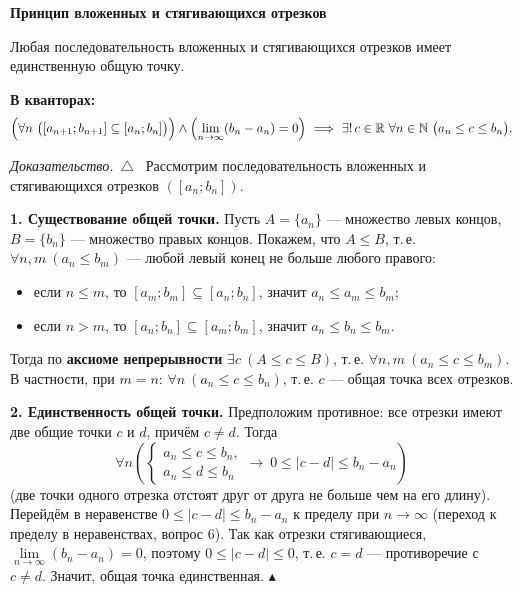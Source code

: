 \documentclass[a4paper,11pt]{article}
\newcommand{\N}{\mathbb{N}}
\newcommand{\R}{\mathbb{R}}
\newcommand{\kv}{\par\noindent\textbf{\textcolor{oprc!85!black}{В кванторах:}}}
\newenvironment{dok}
  {\par\smallskip\noindent\textit{Доказательство.}\ $\triangle$\ \ignorespaces}
  {\unskip\nobreak\hfill$\blacktriangle$\par\smallskip}
\newcommand{\podr}[1]{\par\needspace{8\baselineskip}\medskip
  {\large\bfseries\textcolor{oprc!80!black}{#1}}\par\nopagebreak\smallskip}
\begin{document}
\begin{center}
\end{center}

\podr{Принцип вложенных и стягивающихся отрезков}

\begin{teo}
Любая последовательность вложенных и стягивающихся отрезков имеет единственную общую точку.
\kv
\[
  \Bigl(\forall n\ \bigl([a_{n+1}; b_{n+1}] \subseteq [a_n; b_n]\bigr)\Bigr) \wedge \Bigl(\lim_{n \to \infty} (b_n - a_n) = 0\Bigr)
  \ \Longrightarrow\ \exists!\, c \in \R\ \forall n \in \N\ \bigl(a_n \le c \le b_n\bigr).
\]
\end{teo}

\begin{dok}
Рассмотрим последовательность вложенных и стягивающихся отрезков $([a_n; b_n])$.

\textbf{1. Существование общей точки.} Пусть $A = \{a_n\}$ --- множество левых концов, $B = \{b_n\}$ --- множество правых концов.
Покажем, что $A \le B$, т.\,е. $\forall n, m\ (a_n \le b_m)$ --- любой левый конец не больше любого правого:
\begin{itemize}
  \item если $n \le m$, то $[a_m; b_m] \subseteq [a_n; b_n]$, значит $a_n \le a_m \le b_m$;
  \item если $n > m$, то $[a_n; b_n] \subseteq [a_m; b_m]$, значит $a_n \le b_n \le b_m$.
\end{itemize}
Тогда по \textbf{аксиоме непрерывности} $\exists c\ (A \le c \le B)$, т.\,е. $\forall n, m\ (a_n \le c \le b_m)$.
В частности, при $m = n$: $\forall n\ (a_n \le c \le b_n)$, т.\,е. $c$ --- общая точка всех отрезков.

\textbf{2. Единственность общей точки.} Предположим противное: все отрезки имеют две общие точки $c$ и $d$, причём $c \ne d$. Тогда
\[
  \forall n \left(\begin{cases}
    a_n \le c \le b_n, \\
    a_n \le d \le b_n
  \end{cases} \to\ 0 \le |c - d| \le b_n - a_n\right)
\]
(две точки одного отрезка отстоят друг от друга не больше чем на его длину).
Перейдём в неравенстве $0 \le |c - d| \le b_n - a_n$ к пределу при $n \to \infty$ (переход к пределу в неравенствах, вопрос 6).
Так как отрезки стягивающиеся, $\lim\limits_{n \to \infty} (b_n - a_n) = 0$, поэтому $0 \le |c - d| \le 0$, т.\,е. $c = d$ ---
противоречие с $c \ne d$. Значит, общая точка единственная.
\end{dok}
\end{document}
